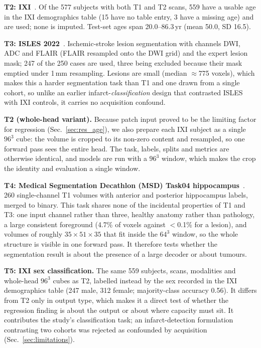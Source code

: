 \iffull\documentclass[journal]{IEEEtran}\else\documentclass[journal,twoside,web]{ieeecolor}\usepackage{generic}\fi
\begin{document}
\textbf{T2: IXI}~\cite{ixi}. Of the 577 subjects with both T1 and T2 scans, 559 have a usable age in the IXI demographics table (15 have no table entry, 3 have a missing age) and are used; none is imputed. Test-set ages span 20.0--86.3\,yr (mean 50.0, SD 16.5).

\textbf{T3: ISLES 2022}~\cite{isles2022}. Ischemic-stroke lesion segmentation with channels DWI, ADC and FLAIR (FLAIR resampled onto the DWI grid) and the expert lesion mask; 247 of the 250 cases are used, three being excluded because their mask emptied under 1\,mm resampling. Lesions are small (median $\approx$775 voxels), which makes this a harder segmentation task than T1 and one drawn from a single cohort, so unlike an earlier infarct-\emph{classification} design that contrasted ISLES with IXI controls, it carries no acquisition confound.

\textbf{T2 (whole-head variant).} Because patch input proved to be the limiting factor for regression (Sec.~\ref{sec:res_age}), we also prepare each IXI subject as a single $96^3$ cube: the volume is cropped to its non-zero content and resampled, so one forward pass sees the entire head. The task, labels, splits and metrics are otherwise identical, and models are run with a $96^3$ window, which makes the crop the identity and evaluation a single window.

\textbf{T4: Medical Segmentation Decathlon (MSD) Task04 hippocampus}~\cite{msd}. 260 single-channel T1 volumes with anterior and posterior hippocampus labels, merged to binary. This task shares none of the incidental properties of T1 and T3: one input channel rather than three, healthy anatomy rather than pathology, a large consistent foreground (4.7\% of voxels against $<$0.1\% for a lesion), and volumes of roughly $35{\times}51{\times}35$ that fit inside the $64^3$ window, so the whole structure is visible in one forward pass. It therefore tests whether the segmentation result is about the presence of a large decoder or about tumours.

\textbf{T5: IXI sex classification.} The same 559 subjects, scans, modalities and whole-head $96^3$ cubes as T2, labelled instead by the sex recorded in the IXI demographics table (247 male, 312 female; majority-class accuracy 0.56). It differs from T2 only in output type, which makes it a direct test of whether the regression finding is about the output or about where capacity must sit. It contributes the study's classification task; an infarct-detection formulation contrasting two cohorts was rejected as confounded by acquisition (Sec.~\ref{sec:limitations}).
\end{document}
